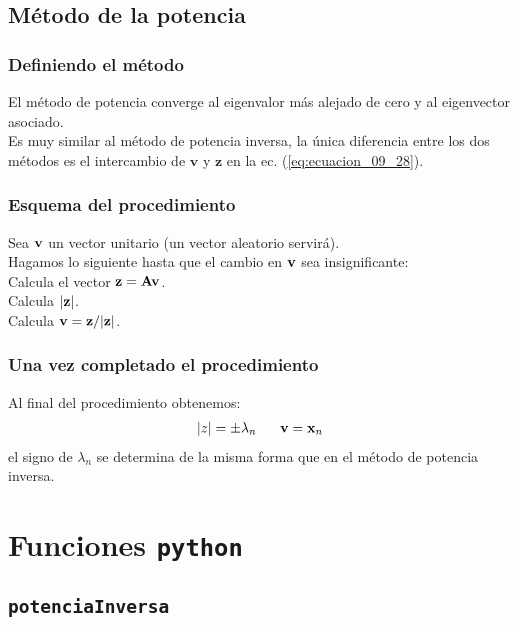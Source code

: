 \documentclass[12pt]{beamer}
\begin{document}
\subsection{Método de la potencia}

\begin{frame}
\frametitle{Definiendo el método}
El método de potencia converge al eigenvalor más alejado de cero y al eigenvector asociado.
\\
\bigskip
\pause
Es muy similar al método de potencia inversa, la única diferencia entre los dos métodos es el intercambio de $\mathbf{v}$ y $\mathbf{z}$ en la ec. (\ref{eq:ecuacion_09_28}).
\end{frame}
\begin{frame}
\frametitle{Esquema del procedimiento}
\begin{tcolorbox}[colback=lavendermist, title=Método de la potencia]
Sea $\vb{v}$ un vector unitario (un vector aleatorio servirá). \\ \pause
Hagamos lo siguiente hasta que el cambio en $\vb{v}$ sea insignificante: \\ \pause
\hspace{1cm} Calcula el vector $\vb{z} = \vb{A v}$. \\ \pause
\hspace{1cm} Calcula $\abs{\vb{z}}$. \\ \pause
\hspace{1cm} Calcula $\vb{v} = \vb{z}/\abs{\vb{z}}$.
\end{tcolorbox}
\end{frame}
\begin{frame}
\frametitle{Una vez completado el procedimiento}
Al final del procedimiento obtenemos:
\pause
\begin{align*}
\abs{z} = \pm \lambda_{n} \hspace{0.6cm} \vb{v} = \vb{x}_{n}
\end{align*}
el signo de $\lambda_{n}$ se determina de la misma forma que en el método de potencia inversa.
\end{frame}

\section{Funciones \texttt{python}}
\subsection{\texttt{potenciaInversa}}
\end{document}

